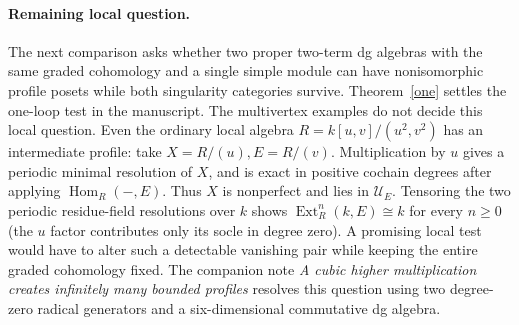 \documentclass[11pt]{article}
\newcommand{\Ext}{\operatorname{Ext}}
\newcommand{\Hom}{\operatorname{Hom}}
\newcommand{\UU}{\mathcal U}
\begin{document}
\paragraph{Remaining local question.}
The next comparison asks whether two proper two-term dg algebras with
the same graded cohomology and a single simple module can have nonisomorphic
profile posets while both singularity categories survive. Theorem~\ref{one} settles the
one-loop test in the manuscript. The multivertex examples do not decide
this local question. Even the ordinary local algebra
$R=k[u,v]/(u^2,v^2)$ has an intermediate profile: take
$X=R/(u), E=R/(v)$. Multiplication by $u$ gives a periodic minimal
resolution of $X$, and is exact in positive cochain degrees after applying
$\Hom_R(-,E)$. Thus $X$ is nonperfect and lies in $\UU_E$. Tensoring
the two periodic residue-field resolutions over $k$ shows
$\Ext_R^n(k,E)\cong k$ for every $n\ge0$ (the $u$ factor contributes
only its socle in degree zero). A promising local test would have to
alter such a detectable vanishing pair while keeping the entire graded
cohomology fixed. The companion note \emph{A cubic higher multiplication creates infinitely
many bounded profiles} resolves this question using two degree-zero
radical generators and a six-dimensional commutative dg algebra.
\end{document}

